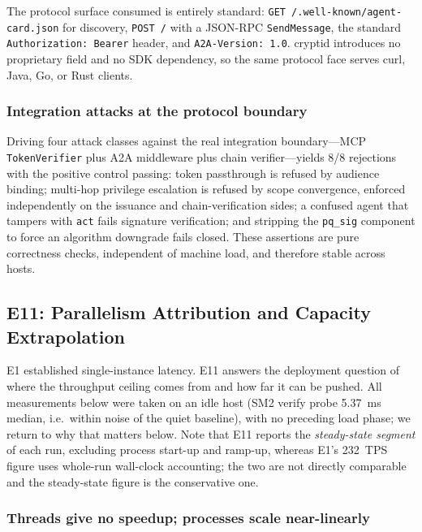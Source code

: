 \documentclass[10pt,twocolumn]{IEEEtran}
\begin{document}
The protocol surface consumed is entirely standard: \texttt{GET
/.well-known/agent-card.json} for discovery, \texttt{POST /} with a
JSON-RPC \texttt{SendMessage}, the standard \texttt{Authorization:
Bearer} header, and \texttt{A2A-Version: 1.0}. cryptid introduces no
proprietary field and no SDK dependency, so the same protocol face serves
curl, Java, Go, or Rust clients.

\subsubsection*{Integration attacks at the protocol boundary}

Driving four attack classes against the real integration boundary---MCP
\texttt{TokenVerifier} plus A2A middleware plus chain verifier---yields
8/8 rejections with the positive control passing: token passthrough is
refused by audience binding; multi-hop privilege escalation is refused by
scope convergence, enforced independently on the issuance and
chain-verification sides; a confused agent that tampers with \texttt{act}
fails signature verification; and stripping the \texttt{pq\_sig} component
to force an algorithm downgrade fails closed. These assertions are pure
correctness checks, independent of machine load, and therefore stable
across hosts.

\subsection{E11: Parallelism Attribution and Capacity Extrapolation}
\label{sec:e11}

E1 established single-instance latency. E11 answers the deployment
question of where the throughput ceiling comes from and how far it can be
pushed.
All measurements below were taken on an idle host (SM2 verify probe
5.37~ms median, i.e.\ within noise of the quiet baseline), with no
preceding load phase; we return to why that matters below. Note that E11
reports the \emph{steady-state segment} of each run, excluding process
start-up and ramp-up, whereas E1's 232~TPS figure uses whole-run wall-clock
accounting; the two are not directly comparable and the steady-state
figure is the conservative one.

\subsubsection*{Threads give no speedup; processes scale near-linearly}
\end{document}
